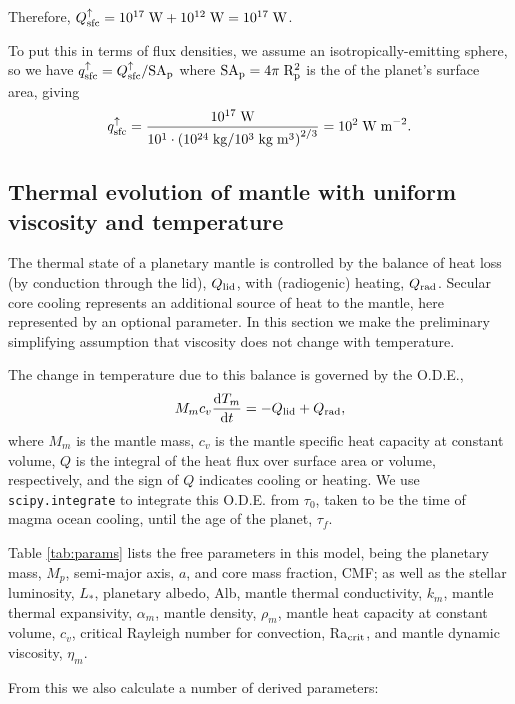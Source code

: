 \documentclass[10pt,a4paper]{article}
\begin{document}
Therefore, $Q_{\rm sfc}^{\uparrow} = 10^{17} \; {\rm W} + 10^{12} \; {\rm W} = 10^{17} \; {\rm W}$.

To put this in terms of flux densities, we assume an isotropically-emitting sphere, so we have $q_{\rm sfc}^{\uparrow} = Q_{\rm sfc}^{\uparrow}/\rm{SA}_p$ where $\rm{SA}_p = 4\pi\;R_p^2$ is the of the planet's surface area, giving 
\begin{equation}
q_{\rm sfc}^{\uparrow} = \frac{10^{17} \; {\rm W}}{10^1 \cdot \left(10^{24}\;{\rm kg}/10^3 \; {\rm kg}\;{\rm m}^3\right)^{2/3}} = 10^2 \; \rm{W\;m}^{-2}.
\end{equation}

\subsection{Thermal evolution of mantle with uniform viscosity and temperature}

The thermal state of a planetary mantle is controlled by the balance of heat loss (by conduction through the lid), $Q_{\rm lid}$, with (radiogenic) heating, $Q_{\rm rad}$. Secular core cooling represents an additional source of heat to the mantle, here represented by an optional parameter. In this section we make the preliminary simplifying assumption that viscosity does not change with temperature.

The change in temperature due to this balance is governed by the O.D.E.,
\begin{equation}
M_m c_v \frac{{\rm d}T_m}{{\rm d}t} = -Q_{\rm lid} + Q_{\rm rad},
\end{equation}
where $M_m$ is the mantle mass, $c_v$ is the mantle specific heat capacity at constant volume, $Q$ is the integral of the heat flux over surface area or volume, respectively, and the sign of $Q$ indicates cooling or heating. We use {\tt scipy.integrate} to integrate this O.D.E. from $\tau_0$, taken to be the time of magma ocean cooling, until the age of the planet, $\tau_f$.  

Table \ref{tab:params} lists the free parameters in this model, being the planetary mass, $M_p$, semi-major axis, $a$, and core mass fraction, CMF; as well as the stellar luminosity, $L_*$, planetary albedo, Alb, mantle thermal conductivity, $k_m$, mantle thermal expansivity, $\alpha_m$, mantle density, $\rho_m$, mantle heat capacity at constant volume, $c_v$, critical Rayleigh number for convection, Ra$_{\rm crit}$, and mantle dynamic viscosity, $\eta_m$.

From this we also calculate a number of derived parameters:
\end{document}
